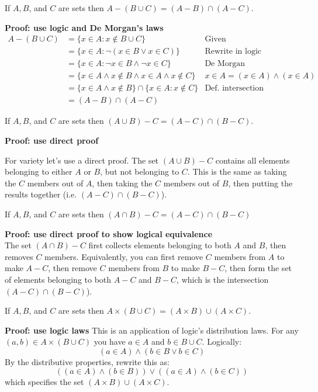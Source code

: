\documentclass{article}
\begin{document}
\begin{problem}
If $A, B$, and $C$ are sets then $A - (B \cup C) = (A - B) \cap (A - C)$.
\end{problem}
\textbf{Proof: use logic and De Morgan's laws}
\begin{align*}
    A - (B \cup C) & = \{x \in A: x \not\in B \cup C\}                               & \text{Given}                        \\
                   & = \{x \in A: \neg(x \in B \lor x \in C)\}                       & \text{Rewrite in logic}             \\
                   & = \{x \in A: \neg x \in B \land \neg x \in C\}                  & \text{De Morgan}                    \\
                   & = \{x \in A \land x \not\in B \land x \in A \land x \not\in C\} & x \in A = (x \in A) \land (x \in A) \\
                   & = \{x \in A \land x \not\in B\} \cap \{x \in A: x \not\in C\}   & \text{Def. intersection}            \\
                   & = (A - B) \cap (A - C)
\end{align*}

\begin{problem}
If $A, B$, and $C$ are sets then $(A \cup B) - C = (A - C) \cap (B - C)$.
\end{problem}
\textbf{Proof: use direct proof}

For variety let's use a direct proof. The set $(A \cup B) - C$ contains all elements belonging to either $A$ or $B$, but not belonging to $C$. This is the same as taking the $C$ members out of $A$, then taking the $C$ members out of $B$, then putting the results together (i.e. $(A - C) \cap (B - C)$).

\begin{problem}
If $A, B$, and $C$ are sets then $(A \cap B) - C = (A - C) \cap (B - C)$
\end{problem}
\textbf{Proof: use direct proof to show logical equivalence}
\\
The set $(A \cap B) - C$ first collects elements belonging to both $A$ and $B$, then removes $C$ members. Equivalently, you can first remove $C$ members from $A$ to make $A - C$, then remove $C$ members from $B$ to make $B - C$, then form the set of elements belonging to both $A - C$ and $B - C$, which is the intersection $(A - C) \cap (B - C)$).

\begin{problem}
If $A, B$, and $C$ are sets then $A \times (B \cup C) = (A \times B) \cup (A \times C)$.
\end{problem}
\textbf{Proof: use logic laws}
This is an application of logic's distribution laws. For any $(a, b) \in A \times (B \cup C)$ you have $a \in A$ and $b \in B \cup C$. Logically:
$$(a \in A) \land (b \in B \lor b \in C)$$
By the distributive properties, rewrite this as:
$$((a \in A) \land (b \in B)) \lor ((a \in A) \land (b \in C))$$
which specifies the set $(A \times B) \cup (A \times C)$.
\end{document}
